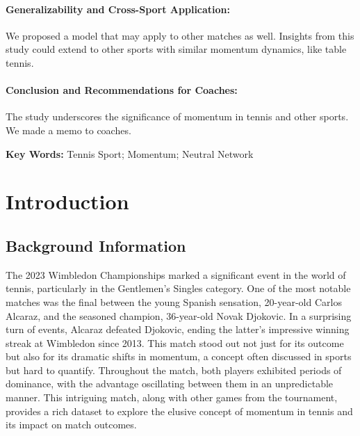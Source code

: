 \documentclass[UTF8]{mcmthesis}
\begin{document}
\begin{summary}
	\paragraph{Generalizability and Cross-Sport Application:}
	We proposed a model that may apply to other matches as well. Insights from this study could extend to other sports with similar momentum dynamics, like table tennis.
	
	\paragraph{Conclusion and Recommendations for Coaches:}
	The study underscores the significance of momentum in tennis and other sports. We made a memo to coaches.

        \noindent\textbf{Key Words: } Tennis Sport; Momentum; Neutral Network
\end{summary}

    \maketitle
    
    \newpage
    
    \tableofcontents
    
    \newpage
    \setlength{\parindent}{2em}
    \setcounter{page}{1}
    \section{Introduction}
    \subsection{Background Information}
    The 2023 Wimbledon Championships marked a significant event in the world of tennis, particularly in the Gentlemen's Singles category. One of the most notable matches was the final between the young Spanish sensation, 20-year-old Carlos Alcaraz, and the seasoned champion, 36-year-old Novak Djokovic. In a surprising turn of events, Alcaraz defeated Djokovic, ending the latter's impressive winning streak at Wimbledon since 2013. This match stood out not just for its outcome but also for its dramatic shifts in momentum, a concept often discussed in sports but hard to quantify. Throughout the match, both players exhibited periods of dominance, with the advantage oscillating between them in an unpredictable manner. This intriguing match, along with other games from the tournament, provides a rich dataset to explore the elusive concept of momentum in tennis and its impact on match outcomes.
	
\end{document}
